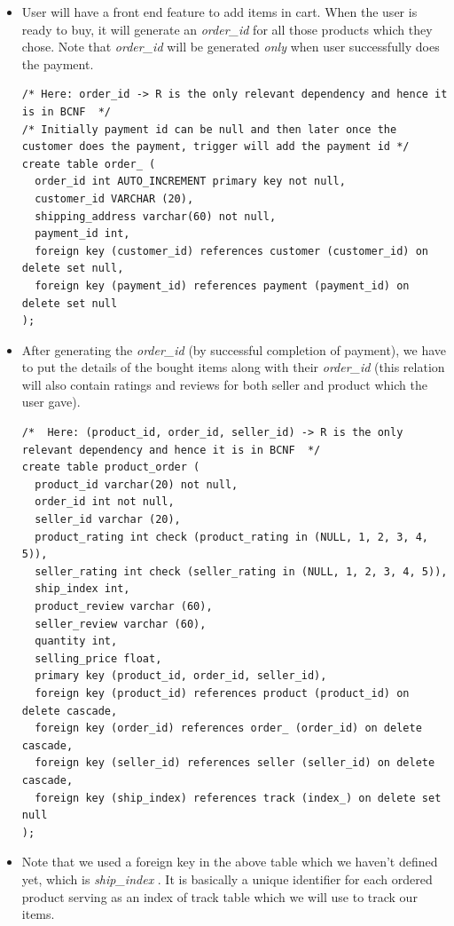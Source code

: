 \documentclass[a4paper,12pt]{article}
\newcommand{\ita}[1]{
    \textit{#1}
}
\begin{document}
\begin{itemize}
\begin{verbatim}
  \end{verbatim}
  \item User will have a front end feature to add items in cart. When the user is ready to buy, it will generate an \ita{order\_id} for all those products which they chose. Note that \ita{order\_id} will be generated \ita{only} when user successfully does the payment.
  \begin{verbatim}
/* Here: order_id -> R is the only relevant dependency and hence it is in BCNF  */
/* Initially payment id can be null and then later once the customer does the payment, trigger will add the payment id */
create table order_ (
  order_id int AUTO_INCREMENT primary key not null,
  customer_id VARCHAR (20),
  shipping_address varchar(60) not null,
  payment_id int,
  foreign key (customer_id) references customer (customer_id) on delete set null,
  foreign key (payment_id) references payment (payment_id) on delete set null
);
  \end{verbatim}
  \item After generating the \ita{order\_id} (by successful completion of payment), we have to put the details of the bought items along with their \ita{order\_id} (this relation will also contain ratings and reviews for both seller and product which the user gave).
  \begin{verbatim}
/*  Here: (product_id, order_id, seller_id) -> R is the only relevant dependency and hence it is in BCNF  */
create table product_order (
  product_id varchar(20) not null,
  order_id int not null,
  seller_id varchar (20),
  product_rating int check (product_rating in (NULL, 1, 2, 3, 4, 5)),
  seller_rating int check (seller_rating in (NULL, 1, 2, 3, 4, 5)),
  ship_index int,
  product_review varchar (60),
  seller_review varchar (60),
  quantity int,
  selling_price float,
  primary key (product_id, order_id, seller_id),
  foreign key (product_id) references product (product_id) on delete cascade,
  foreign key (order_id) references order_ (order_id) on delete cascade,
  foreign key (seller_id) references seller (seller_id) on delete cascade,
  foreign key (ship_index) references track (index_) on delete set null
);
  \end{verbatim}
  \item Note that we used a foreign key in the above table which we haven't defined yet, which is \ita{ship\_index}. It is basically a unique identifier for each ordered product serving as an index of track table which we will use to track our items.
  \begin{verbatim}
    

\end{verbatim}
\end{itemize}
\end{document}
